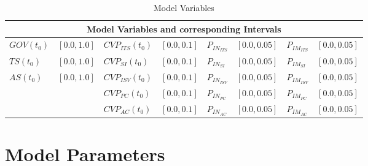 \begin{table}[t]
	\centering
	\begin{tabular}{llllllll}
		\toprule 
		\multicolumn{8}{c}{\footnotesize \textbf{Model Variables and corresponding Intervals}} \\ \midrule
		\footnotesize $GOV(t_0)$ & \footnotesize $[0.0,1.0]$ & \footnotesize $CVP_{ITS}(t_0)$ & \footnotesize $[0.0,0.1]$ & \footnotesize $P_{IN_{ITS}}$ & \footnotesize $[0.0,0.05]$ & \footnotesize $P_{IM_{ITS}}$ & \footnotesize $[0.0,0.05]$ \\
		\footnotesize $TS(t_0)$ & \footnotesize $[0.0,1.0]$ & \footnotesize $CVP_{SI}(t_0)$ & \footnotesize $[0.0,0.1]$ & \footnotesize $P_{IN_{SI}}$ & \footnotesize $[0.0,0.05]$ & \footnotesize $P_{IM_{SI}}$ & \footnotesize $[0.0,0.05]$ \\
		\footnotesize $AS(t_0)$ & \footnotesize $[0.0,1.0]$ & \footnotesize $CVP_{ISV}(t_0)$ & \footnotesize $[0.0,0.1]$ & \footnotesize $P_{IN_{ISV}}$ & \footnotesize $[0.0,0.05]$ & \footnotesize $P_{IM_{ISV}}$ & \footnotesize $[0.0,0.05]$ \\
		& & \footnotesize $CVP_{PC}(t_0)$ & \footnotesize $[0.0,0.1]$ & \footnotesize $P_{IN_{PC}}$ & \footnotesize $[0.0,0.05]$ & \footnotesize $P_{IM_{PC}}$ & \footnotesize $[0.0,0.05]$ \\
		& & \footnotesize $CVP_{AC}(t_0)$ & \footnotesize $[0.0,0.1]$ & \footnotesize $P_{IN_{AC}}$ & \footnotesize $[0.0,0.05]$ & \footnotesize $P_{IM_{AC}}$ & \footnotesize $[0.0,0.05]$ \\ \bottomrule
	\end{tabular}
	\caption{Model Variables}
	\label{tab:mvar}
\end{table}

\section{Model Parameters}\label{ch:sfd:mp}


